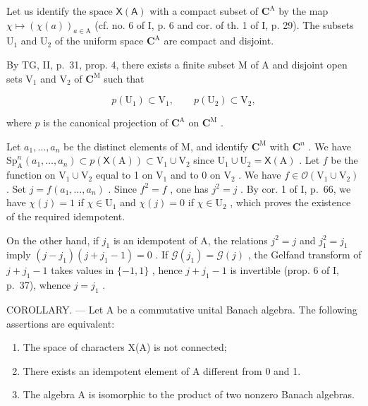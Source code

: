 Let us identify the space \(\mathsf{X}(\mathsf{A})\) with a compact subset of \(\mathbf{C}^{\mathrm{A}}\) by the map \(\chi \mapsto (\chi (a))_{a\in \mathrm{A}}\) (cf. no. 6 of I, p. 6 and cor. of th. 1 of I, p. 29). The subsets \(\mathrm{U}_1\) and \(\mathrm{U}_2\) of the uniform space \(\mathbf{C}^{\mathrm{A}}\) are compact and disjoint.

By TG, II, p.~31, prop. 4, there exists a finite subset M of A and disjoint open sets \(\mathrm{V}_{1}\) and \(\mathrm{V}_{2}\) of \(\mathbf{C}^{\mathrm{M}}\) such that

\[
p (\mathrm{U} _ {1}) \subset \mathrm{V} _ {1}, \qquad p (\mathrm{U} _ {2}) \subset \mathrm{V} _ {2},
\]

where \(p\) is the canonical projection of \(\mathbf{C}^{\mathrm{A}}\) on \(\mathbf{C}^{\mathrm{M}}\) .

Let \(a_1, \ldots, a_n\) be the distinct elements of M, and identify \(\mathbf{C}^{\mathrm{M}}\) with \(\mathbf{C}^n\) . We have \(\mathrm{Sp}_{\mathrm{A}}^{n}(a_{1}, \ldots, a_{n}) \subset p(\mathsf{X}(\mathrm{A})) \subset \mathrm{V}_{1} \cup \mathrm{V}_{2}\) since \(\mathrm{U}_{1} \cup \mathrm{U}_{2} = \mathsf{X}(\mathrm{A})\) . Let \(f\) be the function on \(\mathrm{V}_{1} \cup \mathrm{V}_{2}\) equal to 1 on \(\mathrm{V}_{1}\) and to 0 on \(\mathrm{V}_{2}\) . We have \(f \in \mathcal{O}(\mathrm{V}_{1} \cup \mathrm{V}_{2})\) . Set \(j = f(a_{1}, \ldots, a_{n})\) . Since \(f^{2} = f\) , one has \(j^{2} = j\) . By cor. 1 of I, p.~66, we have \(\chi(j) = 1\) if \(\chi \in \mathrm{U}_{1}\) and \(\chi(j) = 0\) if \(\chi \in \mathrm{U}_{2}\) , which proves the existence of the required idempotent.

On the other hand, if \(j_{1}\) is an idempotent of A, the relations \(j^{2} = j\) and \(j_{1}^{2} = j_{1}\) imply \((j - j_{1})(j + j_{1} - 1) = 0\) . If \(\mathcal{G}(j_{1}) = \mathcal{G}(j)\) , the Gelfand transform of \(j + j_{1} - 1\) takes values in \(\{-1, 1\}\) , hence \(j + j_{1} - 1\) is invertible (prop. 6 of I, p.~37), whence \(j = j_{1}\) .

COROLLARY. --- Let A be a commutative unital Banach algebra. The following assertions are equivalent:

\begin{enumerate}
\def\labelenumi{\alph{enumi})}
\item
  The space of characters X(A) is not connected;
\item
  There exists an idempotent element of A different from 0 and 1.
\item
  The algebra A is isomorphic to the product of two nonzero Banach algebras.
\end{enumerate}

